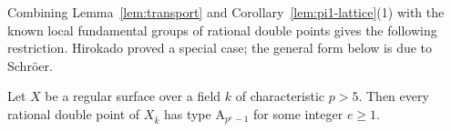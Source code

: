 Combining Lemma~\ref{lem:transport} and Corollary~\ref{lem:pi1-lattice}(1) with the known local fundamental groups of rational double points gives the following restriction.
Hirokado \cite[Theorem~3.4]{Hir04} proved a special case; the general form below is due to Schr\"oer.

\begin{corollary}\label{lem:geometric-rdp}
Let $X$ be a regular surface over a field $k$ of characteristic $p>5$.
Then every rational double point of $X_{\bar k}$ has type $\mathrm A_{p^e-1}$ for some integer $e\geq 1$.
\end{corollary}
